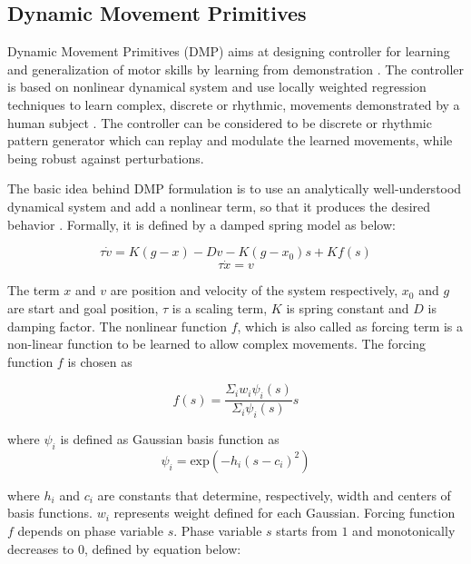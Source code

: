 \documentclass[sigconf]{acmart}
\begin{document}
\subsection{Dynamic Movement Primitives}
\label{sec:dmp}
Dynamic Movement Primitives (DMP) aims at designing controller for learning and generalization of motor skills by learning from demonstration \cite{ijspeert2003learning}. The controller is based on nonlinear dynamical system and use locally weighted regression techniques to learn complex, discrete or rhythmic, movements demonstrated by a human subject \cite{ijspeert2002movement}. The controller can be considered to be discrete or rhythmic pattern generator which can replay and modulate the learned movements, while being robust against perturbations.

The basic idea behind DMP formulation is to use an analytically well-understood dynamical system and add a nonlinear term, so that it produces the desired behavior \cite{ijspeert2013dynamical}. Formally, it is defined by a damped spring model as below:

\begin{equation}
	\tau	 \dot{v} = K (g - x) -D v - K (g - x_0) s + K f(s)
\end{equation}
\begin{equation}
	\tau	 \dot{x} = v
\end{equation}

The term $x$ and $v$ are position and velocity of the system respectively, $x_0$ and $g$ are start and goal position, $\tau$ is a scaling term, $K$ is spring constant and $D$ is damping factor. The nonlinear function $f$, which is also called as forcing term is a non-linear function to be learned to allow complex movements. The forcing function $f$ is chosen as

\begin{equation}
	f(s) = \frac{\Sigma_{i} w_i \psi_i(s)}{\Sigma_{i} \psi_i(s)} s
	\label{eq:forcing_func}
\end{equation}

where $\psi_i$ is defined as Gaussian basis function as
\begin{equation}
	\psi_i = \textrm{exp}\left( -h_i \left( s - c_i\right)^2 \right)
\end{equation}

where $h_i$ and $c_i$ are constants that determine, respectively, width and centers of basis functions. $w_i$ represents weight defined for each Gaussian. Forcing function $f$ depends on phase variable $s$. Phase variable $s$ starts from $1$ and monotonically decreases to $0$, defined by equation below:
\end{document}
